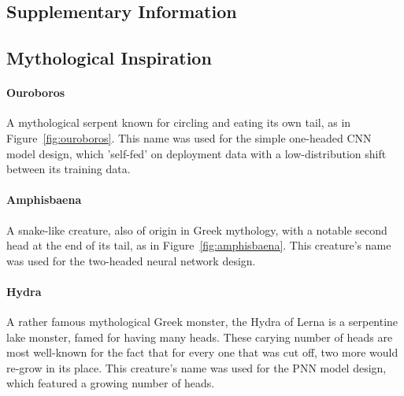 \begin{uomappendix}
    
        \section{Supplementary Information}
    
            \subsection{Mythological Inspiration} \label{app:Greek}
    
                \paragraph{Ouroboros} A mythological serpent known for circling and eating its own tail, as in Figure~\ref{fig:ouroboros}. This name was used for the simple one-headed CNN model design, which 'self-fed' on deployment data with a low-distribution shift between its training data.
    
                \paragraph{Amphisbaena} A snake-like creature, also of origin in Greek mythology, with a notable second head at the end of its tail, as in Figure~\ref{fig:amphisbaena}. This creature's name was used for the two-headed neural network design.
    
                \paragraph{Hydra} A rather famous mythological Greek monster, the Hydra of Lerna is a serpentine lake monster, famed for having many heads. These carying number of heads are most well-known for the fact that for every one that was cut off, two more would re-grow in its place. This creature's name was used for the PNN model design, which featured a growing number of heads.
    

\end{uomappendix}
